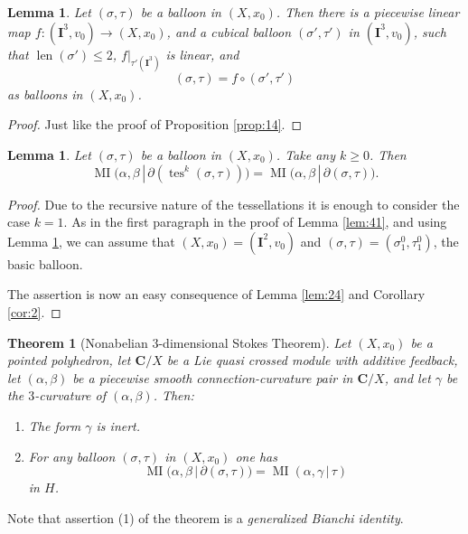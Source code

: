 \documentclass[10pt, a4paper]{amsart}
\newtheorem{thm}[equation]{Theorem}
\newtheorem{lem}[equation]{Lemma}
\theoremstyle{definition}
\numberwithin{equation}{section}
\newcommand{\opn}{\operatorname}
\newcommand{\mbf}[1]{\mathbf{#1}}
\renewcommand{\vert}{\, | \,}
\begin{document}
\begin{lem} \label{lem:40}
Let $(\sigma, \tau)$ be a balloon in $(X, x_0)$. Then there is a piecewise
linear map $f : (\mbf{I}^3, v_0) \to (X, x_0)$, and a cubical balloon 
$(\sigma', \tau')$ in $(\mbf{I}^3, v_0)$, such that 
$\opn{len}(\sigma') \leq 2$, $f|_{\tau'(\mbf{I}^3)}$ is linear, and
\[ (\sigma, \tau) = f \circ (\sigma', \tau') \]
as balloons in $(X, x_0)$.
\end{lem}

\begin{proof}
Just like the proof of Proposition \ref{prop:14}.
\end{proof}

\begin{lem} \label{lem:25}
Let $(\sigma, \tau)$ be a balloon in $(X, x_0)$. 
Take any $k \geq 0$. Then 
\[ \opn{MI} \bigl( \alpha, \beta \vert  
\partial(\opn{tes}^k (\sigma, \tau)) \bigr) =
\opn{MI} \bigl( \alpha, \beta \vert  \partial (\sigma, \tau ) \bigl) . \]
\end{lem}

\begin{proof}
Due to the recursive nature of the tessellations it is enough to consider the
case $k=1$. As in the first paragraph in the proof of Lemma \ref{lem:41}, and
using Lemma \ref{lem:40}, we can assume that 
$(X, x_0) = (\mbf{I}^2, v_0)$ and 
$(\sigma, \tau) = (\sigma^0_1, \tau^0_1)$, the basic balloon.

The assertion is now an easy consequence of Lemma \ref{lem:24} and Corollary 
\ref{cor:2}.
\end{proof}

\begin{thm}[Nonabelian $3$-dimensional Stokes Theorem]
\label{thm:10}
Let $(X, x_0)$ be a pointed polyhedron, let
$\mbf{C} / X$ be a Lie quasi crossed module with additive feedback, 
let $(\alpha, \beta)$ be a piecewise smooth connection-curvature pair in 
$\mbf{C} / X$, and let $\gamma$ be the $3$-curvature of $(\alpha, \beta)$.
Then:
\begin{enumerate}
\item The form $\gamma$ is inert. 
\item For any balloon $(\sigma, \tau)$ in $(X, x_0)$ one has
\[  \opn{MI} \bigl( \alpha, \beta \vert \partial (\sigma, \tau)
\bigr) = 
\opn{MI} (\alpha, \gamma \vert \tau)  \]
in $H$.
\end{enumerate}
\end{thm}

Note that assertion (1) of the theorem is a {\em generalized Bianchi identity}. 
\end{document}
